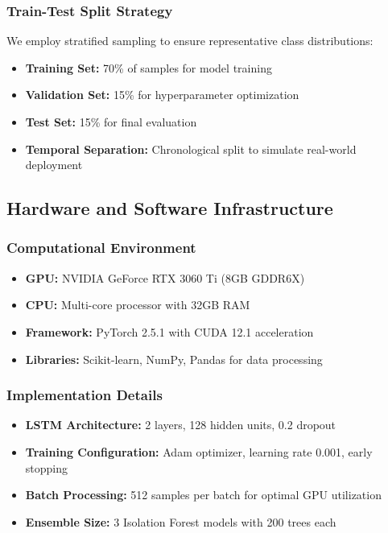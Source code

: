 \documentclass[conference]{IEEEtran}
\begin{document}
\subsubsection{Train-Test Split Strategy}
We employ stratified sampling to ensure representative class distributions:
\begin{itemize}
\item \textbf{Training Set:} 70\% of samples for model training
\item \textbf{Validation Set:} 15\% for hyperparameter optimization
\item \textbf{Test Set:} 15\% for final evaluation
\item \textbf{Temporal Separation:} Chronological split to simulate real-world deployment
\end{itemize}

\subsection{Hardware and Software Infrastructure}

\subsubsection{Computational Environment}
\begin{itemize}
\item \textbf{GPU:} NVIDIA GeForce RTX 3060 Ti (8GB GDDR6X)
\item \textbf{CPU:} Multi-core processor with 32GB RAM
\item \textbf{Framework:} PyTorch 2.5.1 with CUDA 12.1 acceleration
\item \textbf{Libraries:} Scikit-learn, NumPy, Pandas for data processing
\end{itemize}

\subsubsection{Implementation Details}
\begin{itemize}
\item \textbf{LSTM Architecture:} 2 layers, 128 hidden units, 0.2 dropout
\item \textbf{Training Configuration:} Adam optimizer, learning rate 0.001, early stopping
\item \textbf{Batch Processing:} 512 samples per batch for optimal GPU utilization
\item \textbf{Ensemble Size:} 3 Isolation Forest models with 200 trees each
\end{itemize}
\end{document}
